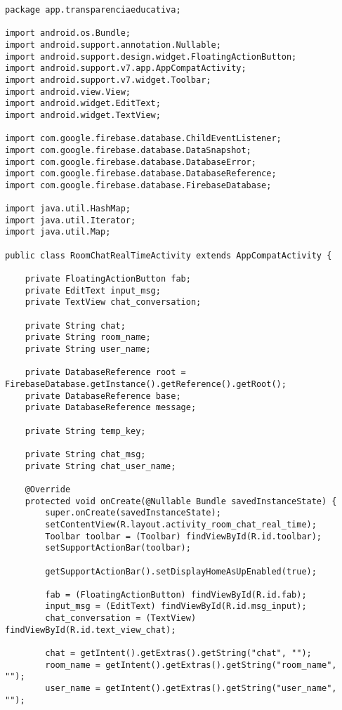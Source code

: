 \documentclass[12pt,a4paper]{article}
\begin{document}
\begin{lstlisting}[caption=./mobile/src/main/java/app/transparenciaeducativa/RoomChatRealTimeActivity.java]
package app.transparenciaeducativa;

import android.os.Bundle;
import android.support.annotation.Nullable;
import android.support.design.widget.FloatingActionButton;
import android.support.v7.app.AppCompatActivity;
import android.support.v7.widget.Toolbar;
import android.view.View;
import android.widget.EditText;
import android.widget.TextView;

import com.google.firebase.database.ChildEventListener;
import com.google.firebase.database.DataSnapshot;
import com.google.firebase.database.DatabaseError;
import com.google.firebase.database.DatabaseReference;
import com.google.firebase.database.FirebaseDatabase;

import java.util.HashMap;
import java.util.Iterator;
import java.util.Map;

public class RoomChatRealTimeActivity extends AppCompatActivity {

    private FloatingActionButton fab;
    private EditText input_msg;
    private TextView chat_conversation;

    private String chat;
    private String room_name;
    private String user_name;

    private DatabaseReference root = FirebaseDatabase.getInstance().getReference().getRoot();
    private DatabaseReference base;
    private DatabaseReference message;

    private String temp_key;

    private String chat_msg;
    private String chat_user_name;

    @Override
    protected void onCreate(@Nullable Bundle savedInstanceState) {
        super.onCreate(savedInstanceState);
        setContentView(R.layout.activity_room_chat_real_time);
        Toolbar toolbar = (Toolbar) findViewById(R.id.toolbar);
        setSupportActionBar(toolbar);

        getSupportActionBar().setDisplayHomeAsUpEnabled(true);

        fab = (FloatingActionButton) findViewById(R.id.fab);
        input_msg = (EditText) findViewById(R.id.msg_input);
        chat_conversation = (TextView) findViewById(R.id.text_view_chat);

        chat = getIntent().getExtras().getString("chat", "");
        room_name = getIntent().getExtras().getString("room_name", "");
        user_name = getIntent().getExtras().getString("user_name", "");


\end{lstlisting}
\end{document}
